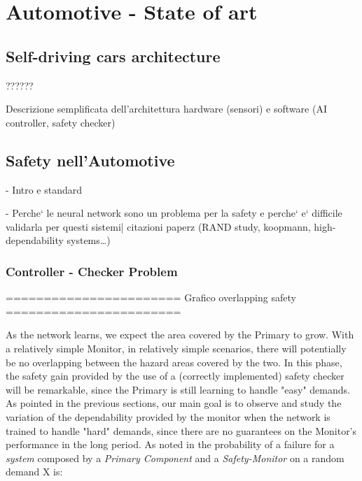 \chapter{Automotive - State of art}

\section{Self-driving cars architecture}

??????

Descrizione semplificata dell'architettura hardware (sensori) e software (AI controller, safety checker)

\section{Safety nell'Automotive}

-  Intro e standard

- Perche` le neural network sono un problema per la safety e perche` e` difficile validarla per questi sistemi| citazioni paperz (RAND study, koopmann, high-dependability systems\dots)



\subsection{Controller - Checker Problem}

======================= \newline
Grafico overlapping safety \newline
======================= \newline

As the network learns, we expect the area covered by the Primary to grow. With a relatively simple Monitor, in relatively simple scenarios, there will potentially be no overlapping between the hazard areas covered by the two. In this phase, the safety gain provided by the use of a (correctly implemented) safety checker will be remarkable, since the Primary is still learning to handle "easy" demands. As pointed in the previous sections, our main goal is to observe and study the variation of the dependability provided by the monitor when the network is trained to handle "hard" demands, since there are no guarantees on the Monitor's performance in the long period.\newline
As noted in \cite{striginiPopov} the probability of a failure for a \textsl{system} composed by a \textsl{Primary Component} and a \textsl{Safety-Monitor} on a random demand X is:

